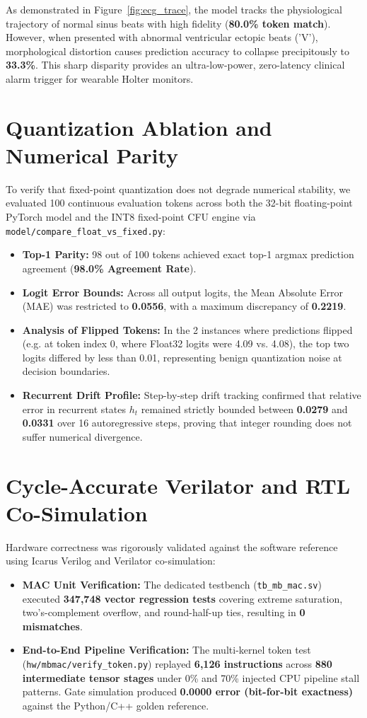\documentclass[11pt,a4paper,oneside]{report}
\begin{document}
As demonstrated in Figure~\ref{fig:ecg_trace}, the model tracks the physiological trajectory of normal sinus beats with high fidelity (\textbf{80.0\% token match}). However, when presented with abnormal ventricular ectopic beats ('V'), morphological distortion causes prediction accuracy to collapse precipitously to \textbf{33.3\%}. This sharp disparity provides an ultra-low-power, zero-latency clinical alarm trigger for wearable Holter monitors.

\section{Quantization Ablation and Numerical Parity}
To verify that fixed-point quantization does not degrade numerical stability, we evaluated 100 continuous evaluation tokens across both the 32-bit floating-point PyTorch model and the INT8 fixed-point CFU engine via \texttt{model/compare\_float\_vs\_fixed.py}:
\begin{itemize}
    \item \textbf{Top-1 Parity:} 98 out of 100 tokens achieved exact top-1 argmax prediction agreement (\textbf{98.0\% Agreement Rate}).
    \item \textbf{Logit Error Bounds:} Across all output logits, the Mean Absolute Error (MAE) was restricted to \textbf{0.0556}, with a maximum discrepancy of \textbf{0.2219}.
    \item \textbf{Analysis of Flipped Tokens:} In the 2 instances where predictions flipped (e.g. at token index 0, where Float32 logits were 4.09 vs. 4.08), the top two logits differed by less than 0.01, representing benign quantization noise at decision boundaries.
    \item \textbf{Recurrent Drift Profile:} Step-by-step drift tracking confirmed that relative error in recurrent states $h_t$ remained strictly bounded between \textbf{0.0279} and \textbf{0.0331} over 16 autoregressive steps, proving that integer rounding does not suffer numerical divergence.
\end{itemize}

\section{Cycle-Accurate Verilator and RTL Co-Simulation}
Hardware correctness was rigorously validated against the software reference using Icarus Verilog and Verilator co-simulation:
\begin{itemize}
    \item \textbf{MAC Unit Verification:} The dedicated testbench (\texttt{tb\_mb\_mac.sv}) executed \textbf{347,748 vector regression tests} covering extreme saturation, two's-complement overflow, and round-half-up ties, resulting in \textbf{0 mismatches}.
    \item \textbf{End-to-End Pipeline Verification:} The multi-kernel token test (\texttt{hw/mbmac/verify\_token.py}) replayed \textbf{6,126 instructions} across \textbf{880 intermediate tensor stages} under 0\% and 70\% injected CPU pipeline stall patterns. Gate simulation produced \textbf{0.0000 error (bit-for-bit exactness)} against the Python/C++ golden reference.
\end{itemize}
\end{document}
